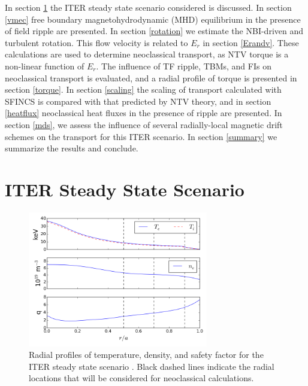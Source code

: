 \documentclass{article}
\numberwithin{figure}{section}
\numberwithin{equation}{section}
\begin{document}
In section \ref{steadystate} the ITER steady state scenario considered is discussed. In section \ref{vmec} free boundary magnetohydrodynamic (MHD) equilibrium in the presence of field ripple are presented. In section \ref{rotation} we estimate the NBI-driven and turbulent rotation. This flow velocity is related to $E_r$ in section \ref{Erandv}. These calculations are used to determine neoclassical transport, as NTV torque is a non-linear function of $E_r$. The influence of TF ripple, TBMs, and FIs on neoclassical transport is evaluated, and a radial profile of torque is presented in section \ref{torque}. In section \ref{scaling} the scaling of transport calculated with SFINCS is compared with that predicted by NTV theory, and in section \ref{heatflux} neoclassical heat fluxes in the presence of ripple are presented. In section \ref{mds}, we assess the influence of several radially-local magnetic drift schemes on the transport for this ITER scenario. In section \ref{summary} we summarize the results and conclude.

\section{ITER Steady State Scenario}\label{steadystate}

\FloatBarrier

\begin{figure}[h!]
\centering
\includegraphics[width=0.7\textwidth]{profiles.png}
\caption{\label{fig:profiles} Radial profiles of temperature, density, and safety factor for the ITER steady state scenario \cite{Poli2014}. Black dashed lines indicate the radial locations that will be considered for neoclassical calculations.}
\end{figure}
\end{document}
